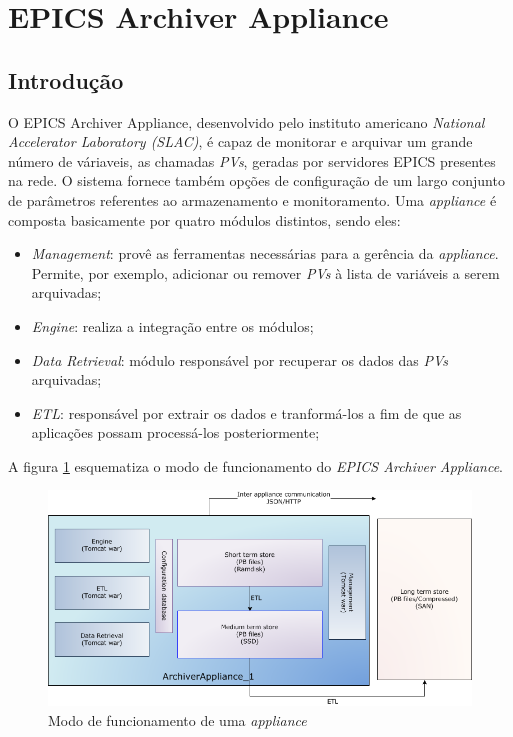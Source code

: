 \section {EPICS Archiver Appliance}

\subsection {Introdução}

O EPICS Archiver Appliance, desenvolvido pelo instituto americano
\textit{National Accelerator Laboratory (SLAC)}, é capaz de monitorar e arquivar
um grande número de váriaveis, as chamadas \textit{PVs}, geradas por servidores
EPICS presentes na rede. O sistema fornece também opções de configuração de um
largo conjunto de parâmetros referentes ao armazenamento e monitoramento. Uma
\textit{appliance} é composta basicamente por quatro módulos distintos, sendo eles:

\begin{itemize}
  \renewcommand\labelitemi{--}
  \item \textit{Management}: provê as ferramentas necessárias para a gerência
  da \textit{appliance}. Permite, por exemplo, adicionar ou remover \textit{PVs}
  à lista de variáveis a serem arquivadas;
  \item \textit{Engine}: realiza a integração entre os módulos;
  \item \textit{Data Retrieval}: módulo responsável por recuperar os dados das
  \textit{PVs} arquivadas;
  \item \textit{ETL}: responsável por extrair os dados e tranformá-los a fim de
  que as aplicações possam processá-los posteriormente;
\end{itemize}

A figura \ref{fig:epics_archiver} esquematiza o modo de funcionamento do
\textit{EPICS Archiver Appliance}.

\FloatBarrier

\begin{figure}[h]
    
    \centering
    \includegraphics[scale=0.6]{image/applarch}
    \caption {Modo de funcionamento de uma \textit{appliance}}
    \label{fig:epics_archiver} 
\end{figure} 

